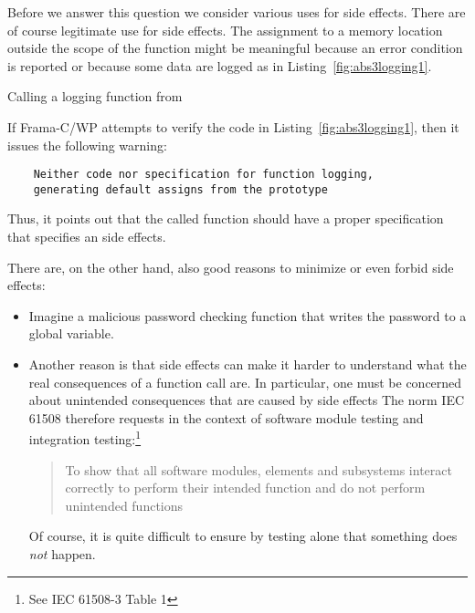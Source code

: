 \FloatBarrier

Before we answer this question we consider various uses for side effects.
There are of course legitimate use for side effects.
The assignment to a memory location outside the scope of the function
might be meaningful because an error condition is reported or because
some data are logged as in Listing~\ref{fig:abs3logging1}.

\begin{listing}[hbt]
\begin{minipage}{\textwidth}

\end{minipage}
\caption{\label{fig:abs3logging1} Calling a logging function from }
\end{listing}

If Frama-C\slash WP attempts to verify the code in Listing~\ref{fig:abs3logging1},
then it issues the following warning:
%
\begin{small}
\begin{verbatim}
    Neither code nor specification for function logging,
    generating default assigns from the prototype
\end{verbatim}
\end{small}
%
Thus, it points out that the called function  should have a proper
specification that specifies an side effects.

\clearpage

There are, on the other hand, also good reasons to minimize or even forbid side 
effects:

\begin{itemize}
\item
Imagine a malicious password checking function that writes the password to
a global variable.

\item
Another reason is that side effects can make it harder to understand what 
the real consequences of a function call are.
In particular, one must be concerned about unintended consequences that
are caused by side effects
The norm IEC 61508 therefore requests in the context of software module testing
and integration testing:\footnote{%
   See IEC 61508-3 Table 1
}

\begin{quote}
To show that all software modules,
elements and subsystems interact correctly
to perform their intended function and do not perform unintended functions
\end{quote}

Of course, it is quite difficult to ensure by testing alone that something does \emph{not} happen.
\end{itemize}

